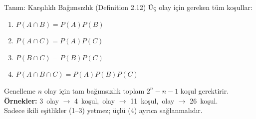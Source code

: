 \documentclass[light]{lutbeamer}
\begin{document}
\begin{frame}{Tanım: Karşılıklı Bağımsızlık (Definition 2.12)}
    Üç olay için gereken tüm koşullar:
    \begin{enumerate}
        \item \(P(A\cap B)=P(A)P(B)\)
        \item \(P(A\cap C)=P(A)P(C)\)
        \item \(P(B\cap C)=P(B)P(C)\)
        \item \(P(A\cap B\cap C)=P(A)P(B)P(C)\)
    \end{enumerate}

    \begin{block}{Genelleme}
        $n$ olay için tam bağımsızlık toplam $2^n - n - 1$ koşul gerektirir.\\
        \textbf{Örnekler:} 3~olay $\rightarrow$ 4~koşul,~olay $\rightarrow$ 11~koşul,~olay $\rightarrow$ 26~koşul.\\
        Sadece ikili eşitlikler (1--3) yetmez; üçlü (4) ayrıca sağlanmalıdır.
    \end{block}
\end{frame}
\end{document}
